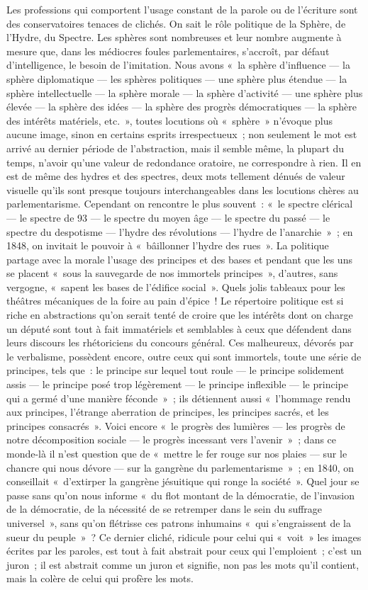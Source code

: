 \documentclass[french,twoside]{book} %
\begin{document}
Les professions qui comportent l’usage constant de la parole ou de l’écriture sont des conservatoires tenaces de clichés. On sait le rôle politique de la Sphère, de l’Hydre, du Spectre. Les sphères sont nombreuses et leur nombre augmente à mesure que, dans les médiocres foules parlementaires, s’accroît, par défaut d’intelligence, le besoin de l’imitation. Nous avons « la sphère d’influence — la sphère diplomatique — les sphères politiques — une sphère plus étendue — la sphère intellectuelle — la sphère morale — la sphère d’activité — une sphère plus élevée — la sphère des idées — la sphère des progrès démocratiques — la sphère des intérêts matériels, etc. », toutes locutions où « sphère » n’évoque plus aucune image, sinon en certains esprits irrespectueux ; non seulement le mot est arrivé au dernier période de l’abstraction, mais il semble même, la plupart du temps, n’avoir qu’une valeur de redondance oratoire, ne correspondre à rien. Il en est de même des hydres et des spectres, deux mots tellement dénués de valeur visuelle qu’ils sont presque toujours interchangeables dans les locutions chères au parlementarisme. Cependant on rencontre le plus souvent : « le spectre clérical — le spectre de 93 — le spectre du moyen âge — le spectre du passé — le spectre du despotisme — l’hydre des révolutions — l’hydre de l’anarchie » ; en 1848, on invitait le pouvoir à « bâillonner l’hydre des rues ». La politique partage avec la morale l’usage des principes et des bases et pendant que les uns se placent « sous la sauvegarde de nos immortels principes », d’autres, sans vergogne, « sapent les bases de l’édifice social ». Quels jolis tableaux pour les théâtres mécaniques de la foire au pain d’épice ! Le répertoire politique est si riche en abstractions qu’on serait tenté de croire que les intérêts dont on charge un député sont tout à fait immatériels et semblables à ceux que défendent dans leurs discours les rhétoriciens du concours général. Ces malheureux, dévorés par le verbalisme, possèdent encore, outre ceux qui sont immortels, toute une série de principes, tels que : le principe sur lequel tout roule — le principe solidement assis — le principe posé trop légèrement — le principe inflexible — le principe qui a germé d’une manière féconde » ; ils détiennent aussi « l’hommage rendu aux principes, l’étrange aberration de principes, les principes sacrés, et les principes consacrés ». Voici encore « le progrès des lumières — les progrès de notre décomposition sociale — le progrès incessant vers l’avenir » ; dans ce monde-là il n’est question que de « mettre le fer rouge sur nos plaies — sur le chancre qui nous dévore — sur la gangrène du parlementarisme » ; en 1840, on conseillait « d’extirper la gangrène jésuitique qui ronge la société ». Quel jour se passe sans qu’on nous informe « du flot montant de la démocratie, de l’invasion de la démocratie, de la nécessité de se retremper dans le sein du suffrage universel », sans qu’on flétrisse ces patrons inhumains « qui s’engraissent de la sueur du peuple » ? Ce dernier cliché, ridicule pour celui qui « voit » les images écrites par les paroles, est tout à fait abstrait pour ceux qui l’emploient ; c’est un juron ; il est abstrait comme un juron et signifie, non pas les mots qu’il contient, mais la colère de celui qui profère les mots.\par
\end{document}
